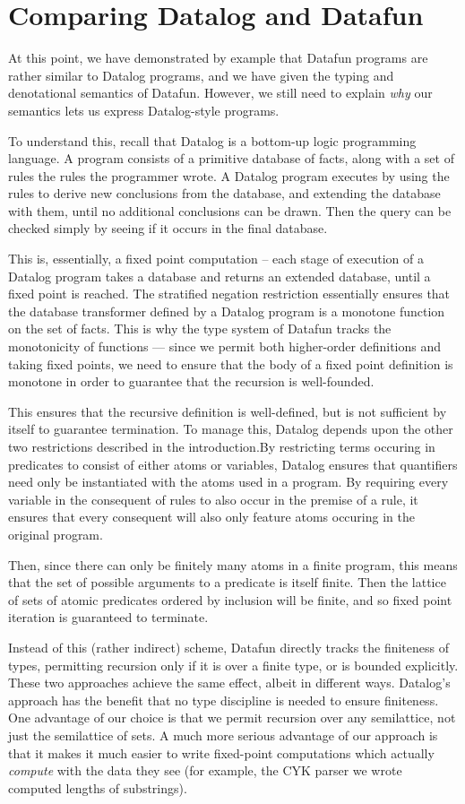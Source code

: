 \section{Comparing Datalog and Datafun}
\label{sec:datalog-vs-datafun}

At this point, we have
demonstrated by example that Datafun programs are rather similar to
Datalog programs, and we have given the typing and denotational
semantics of Datafun. However, we still need to explain \emph{why} our
semantics lets us express Datalog-style programs.

To understand this, recall that Datalog is a bottom-up logic
programming language. A program consists of a primitive database of
facts, along with a set of rules the rules the programmer wrote. A
Datalog program executes by using the rules to derive new conclusions
from the database, and extending the database with them, until no
additional conclusions can be drawn. Then the query can be checked
simply by seeing if it occurs in the final database.

This is, essentially, a fixed point computation -- each stage of
execution of a Datalog program takes a database and returns an
extended database, until a fixed point is reached. The stratified
negation restriction essentially ensures that the database transformer
defined by a Datalog program is a monotone function on the set of
facts. This is why the type system of Datafun tracks the monotonicity
of functions --- since we permit both higher-order definitions and
taking fixed points, we need to ensure that the body of a fixed point
definition is monotone in order to guarantee that the recursion is
well-founded.

This ensures that the recursive definition is well-defined, but is not
sufficient by itself to guarantee termination. To manage this, Datalog
depends upon the other two restrictions described in the
introduction.By restricting terms occuring in predicates to consist of
either atoms or variables, Datalog ensures that quantifiers need only
be instantiated with the atoms used in a program. By requiring every
variable in the consequent of rules to also occur in the premise of a
rule, it ensures that every consequent will also only feature atoms
occuring in the original program.

Then, since there can only be finitely many atoms in a finite program,
this means that the set of possible arguments to a predicate is itself
finite. Then the lattice of sets of atomic predicates ordered by
inclusion will be finite, and so fixed point iteration is guaranteed
to terminate.

Instead of this (rather indirect) scheme, Datafun directly tracks the
finiteness of types, permitting recursion only if it is over a finite
type, or is bounded explicitly. These two approaches achieve the same
effect, albeit in different ways. Datalog's approach has the benefit
that no type discipline is needed to ensure finiteness. One advantage
of our choice is that we permit recursion over any semilattice, not
just the semilattice of sets. A much more serious advantage of our
approach is that it makes it much easier to write fixed-point
computations which actually \emph{compute} with the data they see (for
example, the CYK parser we wrote computed lengths of substrings). 
